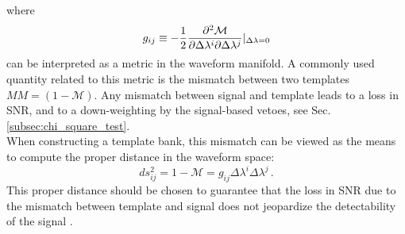 \documentclass[binding=0.6cm, LaM]{sapthesis}
\begin{document}
	where 
		\begin{equation}
			 g_{ij} \equiv -{1 \over 2} {{\partial^2\mathcal{M}} \over {\partial  \Delta \lambda^i  \partial \Delta \lambda^j}}\vert_{\Delta \lambda = 0}
		\end{equation}
	can be interpreted as a metric in the waveform manifold.  A commonly used quantity related to this metric
	is the mismatch between two templates $MM = (1 − \mathcal{M})$.
	Any mismatch between signal and template leads to a loss in SNR, 
	and to a down-weighting by the signal-based vetoes, see Sec.\,\ref{subsec:chi_square_test}. \\
	When constructing a template bank, this mismatch can be viewed as the means
	to compute the proper distance in the waveform space:
		\begin{equation}
			ds_{ij}^2 = 1 − \mathcal{M} = g_{ij} \Delta \lambda^i \Delta \lambda^j\,.
		\end{equation}
	This proper distance should be chosen to guarantee that the loss in SNR due to the mismatch 
	between template and signal does not jeopardize the detectability of the signal \cite{30}.
\end{document}

